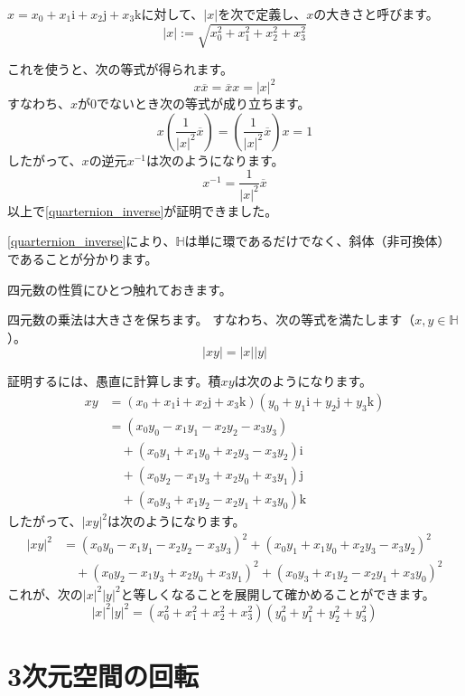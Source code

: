 \documentclass{jlreq}
\numberwithin{equation}{section}
\newcommand{\ii}{\mathrm{i}}
\newcommand{\jj}{\mathrm{j}}
\newcommand{\kk}{\mathrm{k}}
\begin{document}
\begin{definition}
    \(x=x_0+x_1\ii+x_2\jj+x_3\kk\)に対して、\(|x|\)を次で定義し、\(x\)の大きさと呼びます。
    \[
        |x|:=\sqrt{x_0^2+x_1^2+x_2^2+x_3^2}
    \]
\end{definition}

これを使うと、次の等式が得られます。
\[
    x\overline{x}=\overline{x}x=|x|^2
\]
すなわち、\(x\)が\(0\)でないとき次の等式が成り立ちます。
\[
    x\left(\frac{1}{|x|^2}\overline{x}\right)=\left(\frac{1}{|x|^2}\overline{x}\right)x=1
\]
したがって、\(x\)の逆元\(x^{-1}\)は次のようになります。
\[
    x^{-1}=\frac{1}{|x|^2}\overline{x}
\]
以上で\autoref{quarternion_inverse}が証明できました。

\autoref{quarternion_inverse}により、\(\mathbb{H}\)は単に環であるだけでなく、斜体（非可換体）であることが分かります。

四元数の性質にひとつ触れておきます。

\begin{theorem}
    四元数の乗法は大きさを保ちます。
    すなわち、次の等式を満たします（\(x,y\in\mathbb{H}\)）。
    \[
        |xy|=|x||y|
    \]
\end{theorem}

証明するには、愚直に計算します。積\(xy\)は次のようになります。
\begin{align}
    xy & =(x_0+x_1\ii+x_2\jj+x_3\kk)(y_0+y_1\ii+y_2\jj+y_3\kk) \\
       & =(x_0y_0-x_1y_1-x_2y_2-x_3y_3)                        \\
       & \quad +(x_0y_1+x_1y_0+x_2y_3-x_3y_2)\ii               \\
       & \quad +(x_0y_2-x_1y_3+x_2y_0+x_3y_1)\jj               \\
       & \quad +(x_0y_3+x_1y_2-x_2y_1+x_3y_0)\kk
\end{align}
したがって、\(|xy|^2\)は次のようになります。
\begin{align}
    |xy|^2 & =(x_0y_0-x_1y_1-x_2y_2-x_3y_3)^2+(x_0y_1+x_1y_0+x_2y_3-x_3y_2)^2       \\
           & \quad +(x_0y_2-x_1y_3+x_2y_0+x_3y_1)^2+(x_0y_3+x_1y_2-x_2y_1+x_3y_0)^2
\end{align}
これが、次の\(|x|^2|y|^2\)と等しくなることを展開して確かめることができます。
\[
    |x|^2|y|^2=(x_0^2+x_1^2+x_2^2+x_3^2)(y_0^2+y_1^2+y_2^2+y_3^2)
\]

\section{3次元空間の回転}
\end{document}

